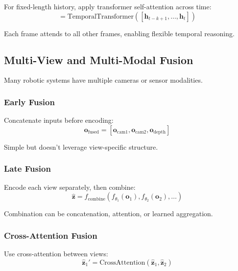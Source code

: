 For fixed-length history, apply transformer self-attention across time:
\begin{equation}
[\hat{\mathbf{z}}_{t-k+1}, \ldots, \hat{\mathbf{z}}_t] = \text{TemporalTransformer}([\mathbf{h}_{t-k+1}, \ldots, \mathbf{h}_t])
\label{eq:temporal_transformer}
\end{equation}

Each frame attends to all other frames, enabling flexible temporal reasoning.

\subsection{Multi-View and Multi-Modal Fusion}

Many robotic systems have multiple cameras or sensor modalities.

\subsubsection{Early Fusion}

Concatenate inputs before encoding:
\begin{equation}
\mathbf{o}_{\text{fused}} = [\mathbf{o}_{\text{cam1}}, \mathbf{o}_{\text{cam2}}, \mathbf{o}_{\text{depth}}]
\label{eq:early_fusion}
\end{equation}

Simple but doesn't leverage view-specific structure.

\subsubsection{Late Fusion}

Encode each view separately, then combine:
\begin{equation}
\hat{\mathbf{z}} = f_{\text{combine}}(f_{\theta_1}(\mathbf{o}_1), f_{\theta_2}(\mathbf{o}_2), \ldots)
\label{eq:late_fusion}
\end{equation}

Combination can be concatenation, attention, or learned aggregation.

\subsubsection{Cross-Attention Fusion}

Use cross-attention between views:
\begin{equation}
\hat{\mathbf{z}}_1' = \text{CrossAttention}(\hat{\mathbf{z}}_1, \hat{\mathbf{z}}_2)
\label{eq:cross_attention_fusion}
\end{equation}


